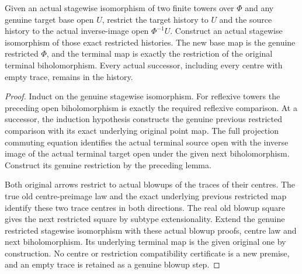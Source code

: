 \begin{theorem}
\label{hir:sharp-actual-stagewise-comparison-open-restriction}
\leanok
Given an actual stagewise isomorphism of two finite towers over $\Phi$ and
any genuine target base open $U$, restrict the target history to $U$ and
the source history to the actual inverse-image open $\Phi^{-1}U$.
Construct an actual stagewise isomorphism of those exact restricted histories.
The new base map is the genuine restricted $\Phi$, and the terminal map is
exactly the restriction of the original terminal biholomorphism. Every actual
successor, including every centre with empty trace, remains in the history.
\end{theorem}
\begin{proof}
Induct on the genuine stagewise isomorphism. For reflexive towers the preceding
open biholomorphism is exactly the required reflexive comparison. At a
successor, the induction hypothesis constructs the genuine previous restricted
comparison with its exact underlying original point map. The full projection
commuting equation identifies the actual terminal source open with the
inverse image of the actual terminal target open under the given next
biholomorphism. Construct its genuine restriction by the preceding lemma.

Both original arrows restrict to actual blowups of the traces of their
centres. The true old centre-preimage law and the exact underlying previous
restricted map identify these two trace centres in both directions.
The real old blowup square gives the next restricted square by subtype
extensionality. Extend the genuine restricted stagewise isomorphism with
these actual blowup proofs, centre law and next biholomorphism. Its underlying
terminal map is the given original one by construction. No centre or
restriction compatibility certificate is a new premise, and an empty trace
is retained as a genuine blowup step.
\end{proof}

